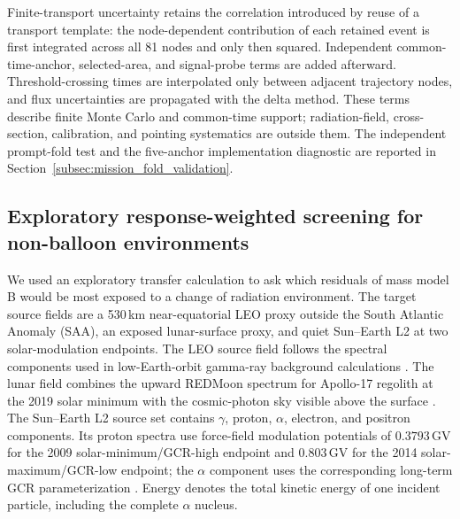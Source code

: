 \documentclass[11pt]{article}
\begin{document}
Finite-transport uncertainty retains the correlation introduced by reuse of a
transport template: the node-dependent contribution of each retained event is
first integrated across all 81 nodes and only then squared. Independent
common-time-anchor, selected-area, and signal-probe terms are added afterward.
Threshold-crossing times are interpolated only between adjacent trajectory
nodes, and flux uncertainties are propagated with the delta method. These terms
describe finite Monte Carlo and common-time support; radiation-field,
cross-section, calibration, and pointing systematics are outside them. The
independent prompt-fold test and the five-anchor implementation diagnostic are
reported in Section~\ref{subsec:mission_fold_validation}.

\subsection{Exploratory response-weighted screening for non-balloon environments}
\label{subsec:environment_transfer_method}

We used an exploratory transfer calculation to ask which residuals of mass
model B would be most exposed to a change of radiation environment. The target
source fields are a 530\,km near-equatorial LEO proxy outside the South
Atlantic Anomaly (SAA), an exposed lunar-surface proxy, and quiet Sun--Earth L2
at two solar-modulation endpoints. The LEO source field follows the spectral
components used in low-Earth-orbit gamma-ray background calculations
\cite{Cumani2019LEO}. The lunar field combines the upward REDMoon spectrum for
Apollo-17 regolith at the 2019 solar minimum with the cosmic-photon sky visible
above the surface \cite{Dobynde2021REDMoon}. The Sun--Earth L2 source set
contains $\gamma$, proton, $\alpha$, electron, and positron components. Its
proton spectra use force-field modulation potentials of
$0.3793$\,GV for the 2009 solar-minimum/GCR-high endpoint and $0.803$\,GV for
the 2014 solar-maximum/GCR-low endpoint; the $\alpha$ component uses the
corresponding long-term GCR parameterization
\cite{Lotti2021Athena,Usoskin2005,Kuznetsov2017}. Energy denotes the total
kinetic energy of one incident particle, including the complete $\alpha$
nucleus.
\end{document}
